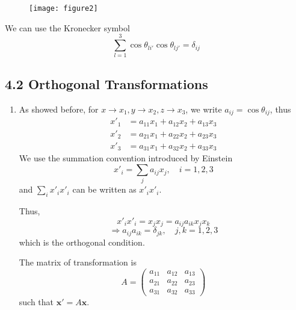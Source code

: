 \documentclass{article}
\begin{document}
\begin{enumerate}
		\begin{figure}[h]
			\centering
			\texttt{[image: figure2]}
			\caption{}
			\label{fig:figure2}
		\end{figure}
		
		We can use the Kronecker symbol
		\[
		\sum_{l=1}^{3} \cos\theta_{li'} \cos\theta_{lj'} = \delta_{ij}
		\]
	\end{enumerate}
	
	\subsection*{4.2 Orthogonal Transformations}
	\begin{enumerate}
		\item As showed before, for $x \to x_1, y \to x_2, z \to x_3$, we write $a_{ij} = \cos\theta_{ij}$, thus
		\begin{align*}
			x'_1 &= a_{11}x_1 + a_{12}x_2 + a_{13}x_3 \\
			x'_2 &= a_{21}x_1 + a_{22}x_2 + a_{23}x_3 \\
			x'_3 &= a_{31}x_1 + a_{32}x_2 + a_{33}x_3
		\end{align*}
		We use the summation convention introduced by Einstein
		\[
		x'_i = \sum_{j} a_{ij}x_j, \quad i=1,2,3
		\]
		and $\sum_i x'_i x'_i$ can be written as $x'_i x'_i$.
		
		Thus,
		\[
		x'_i x'_i = x_j x_j = a_{ij} a_{ik} x_j x_k
		\]
		\[
		\Rightarrow a_{ij} a_{ik} = \delta_{jk}, \quad j,k=1,2,3
		\]
		which is the orthogonal condition.
		
		The matrix of transformation is
		\[
		A = 
		\begin{pmatrix}
			a_{11} & a_{12} & a_{13} \\
			a_{21} & a_{22} & a_{23} \\
			a_{31} & a_{32} & a_{33}
		\end{pmatrix}
		\]
		such that $\mathbf{x'} = A\mathbf{x}$.
	\end{enumerate}
	
\end{document}
